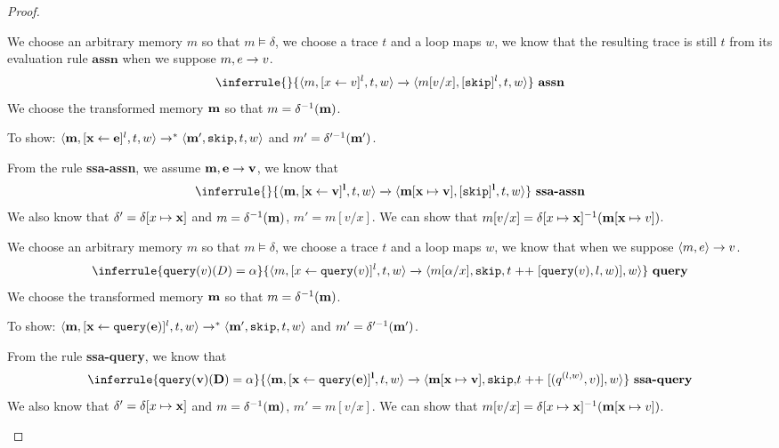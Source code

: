 \documentclass[a4paper,11pt]{article}
\begin{document}
\begin{proof}
\begin{itemize}
 We choose an arbitrary memory $m$ so that $m \vDash \delta$, we choose a trace $t$ and a loop maps $w$, we know that the resulting trace is still $t$ from its evaluation rule $\textbf{assn}$ when we suppose $m, e \to v$.
 \[
 \inferrule
{
}
{
\config{m, [\assign x v]^{l},  t,w} \xrightarrow{} \config{m[v/x], [\eskip]^{l}, t,w}
}
~\textbf{assn}
 \]
 We choose the transformed memory ${\mathbf{{m}}} $ so that  $ m =\delta^{-1}(\mathbf{{m}})$.
 
 To show: $\langle \mathbf{{m}}, [\mathrel{ \mathbf{{x}} \leftarrow  \mathbf{{e}} }]^{l} , t, w \rangle \to^{*} \langle \mathbf{{m'}}, \mathtt{skip}, t, w \rangle $ and $ m' = \delta'^{-1}(\mathbf{{m'}}) $.
 
 From the rule \textbf{ssa-assn}, we assume $\mathbf{{m}}, \mathbf{{e}} \to \mathbf{{v}}$, we know that 
 \[
 \inferrule
{
}
{
\config{\ssa{ m, [\assign x v]^{l}},  t,w } \xrightarrow{} \config{\ssa{m[x \mapsto v], [\eskip]^{l}}, t,w }
}
~\textbf{ssa-assn}
 \]
 We also know that $\delta'= \delta[x \mapsto \mathbf{{x}}]$ and $m = \delta^{-1}(\mathbf{{m}})$, $m'= m[v/x]$. We can show that $ m[v/x] = \delta[x \mapsto \mathbf{{x}}]^{-1}(\mathbf{{m}}[\mathbf{{x}} \mapsto v]) $.
 
We choose an arbitrary memory $m$ so that $m \vDash \delta$, we choose a trace $t$ and a loop maps $w$, we know that when we suppose $\langle m, e \rangle \to v$.
 \[
\inferrule
{
\query(v)(D) = \qval 
}
{
\config{m, [\assign{x}{\query(v)}]^l, t, w} \xrightarrow{} \config{m[ \qval/ x], \eskip,  t \mathrel{++} [\query(v),l,w )],w }
}
~\textbf{query}
 \]
 We choose the transformed memory ${\mathbf{{m}}} $ so that  $ m =\delta^{-1}(\mathbf{{m}})$.
 
 To show: $\langle \mathbf{{m}}, [\mathrel{ \mathbf{{x}} \leftarrow  \mathbf{{{\tt query}(e)}} }]^{l} , t, w \rangle \to^{*} \langle \mathbf{{m'}}, \mathtt{skip}, t, w \rangle $ and $ m' = \delta'^{-1}(\mathbf{{m'}}) $.
 
 From the rule \textbf{ssa-query}, we know that 
 \[
 \inferrule
{
\ssa{\query(v)(D) = \qval} 
}
{
\config{ \ssa{ m, [\assign{\ssa{x}}{\ssa{\query(\expr)}}]^l}, t, w} \xrightarrow{} \config{\ssa{  m[  x \mapsto v], \eskip,}  t \mathrel{++} [(q^{(l,w )},v)],w }
}
~\textbf{ssa-query}
 \]
 We also know that $\delta'= \delta[x \mapsto \mathbf{{x}}]$ and $m = \delta^{-1}(\mathbf{{m}})$, $m'= m[v/x]$. We can show that $ m[v/x] = \delta[x \mapsto \mathbf{{x}}]^{-1}(\mathbf{{m}}[\mathbf{{x}} \mapsto v]) $.


\end{itemize}
\end{proof}
\end{document}
